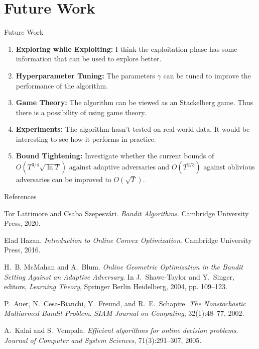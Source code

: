 \documentclass{beamer}
\begin{document}
\section{Future Work}
\begin{frame}{Future Work}
    \begin{enumerate}
        \item \textbf{Exploring while Exploiting:} I think the exploitation phase has some information that can be used to explore better.
        \item \textbf{Hyperparameter Tuning:} The parameters $\gamma$ can be tuned to improve the performance of the algorithm.
        \item \textbf{Game Theory:} The algorithm can be viewed as an Stackelberg game. Thus there is a possibility of using game theory.
        \item \textbf{Experiments:} The algorithm hasn't tested on real-world data. It would be interesting to see how it performs in practice.
        \item \textbf{Bound Tightening:} Investigate whether the current bounds of \( O(T^{3/4} \sqrt{\ln T}) \) against adaptive adversaries and \( O(T^{2/3}) \) against oblivious adversaries can be improved to \( O(\sqrt{T}) \).
        \end{enumerate}
\end{frame}
\begin{frame}[allowframebreaks]{References}
    \begin{thebibliography}{10}

        \beamertemplatebookbibitems
        Tor Lattimore and Csaba Szepesv{\'a}ri.
        \newblock \emph{Bandit Algorithms}.
        \newblock Cambridge University Press, 2020.

        Elad Hazan.
        \newblock \emph{Introduction to Online Convex Optimization}.
        \newblock Cambridge University Press, 2016.

        \beamertemplatearticlebibitems
        H.~B. McMahan and A.~Blum.
        \newblock \emph{Online Geometric Optimization in the Bandit Setting Against an Adaptive Adversary}.
        \newblock In J.~Shawe-Taylor and Y.~Singer, editors, \emph{Learning Theory}, Springer Berlin Heidelberg, 2004, pp. 109--123.

        P.~Auer, N.~Cesa-Bianchi, Y.~Freund, and R.~E.~Schapire.
        \newblock \emph{The Nonstochastic Multiarmed Bandit Problem}.
        \newblock \emph{SIAM Journal on Computing}, 32(1):48--77, 2002.

        A.~Kalai and S.~Vempala.
        \newblock \emph{Efficient algorithms for online decision problems}.
        \newblock \emph{Journal of Computer and System Sciences}, 71(3):291--307, 2005.
    \end{thebibliography}
\end{frame}
\end{document}
